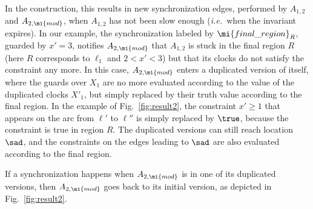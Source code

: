 \documentclass{LMCS}
\theoremstyle{plain}\newtheorem*{prop11}{Proposition~\ref{prop:states} bis}
\def\ie{{\em i.e.\ }}
\begin{document}
In the construction, this results in new synchronization edges, performed
by $A_{1,2}$ and $A_{2,\mi{mod}}$, when $A_{1,2}$ has not been
slow enough (\ie when the invariant expires).
In our example, the synchronization labeled by $\mi{final\_region}_R$,
guarded by $x'=3$, notifies $A_{2,\mi{mod}}$ that $A_{1,2}$
is stuck in the final region $R$ (here $R$ corresponds to $\ell_1$ and $2
< x' < 3$) but that its clocks do not satisfy the constraint any more.
In this case, $A_{2,\mi{mod}}$ enters a duplicated version of itself, where
the guards over $X_1$ are no more evaluated according to the value of the
duplicated clocks $X'_1$, but simply replaced by their truth value according
to the final region.
In the example of Fig.~\ref{fig:result2}, the constraint $x' \geq 1$ that
appears on the arc from $\ell'$ to $\ell''$ is simply replaced by $\true$,
because the constraint is true in region $R$.
The duplicated versions can still reach location
$\sad$,
and the constraints on the edges leading to $\sad$ are also evaluated
according to the final region.

If a synchronization happens when $A_{2,\mi{mod}}$ is in one of its
duplicated versions,
then $A_{2,\mi{mod}}$ goes back to its initial version,
as depicted in Fig.~\ref{fig:result2}.
\end{document}
